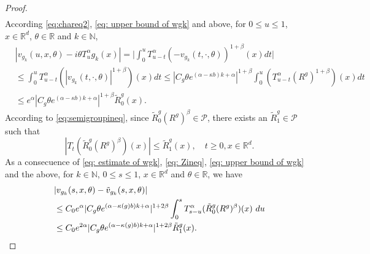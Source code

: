\documentclass[12pt, a4paper]{amsart}
\theoremstyle{definition}
\numberwithin{equation}{section}
\begin{document}
\begin{proof}
\begin{align}
\end{align}
    According \eqref{eq:chareq2}, \eqref{eq: upper bound of wgk} and above, for $0\leq u \leq 1$, $x\in \mathbb{R}^d$, $\theta \in \mathbb{R}$ and $k \in \mathbb N$,
\begin{align}
\label{eq: Zineq}
   &|v_{g_{k}}(u,x,\theta)-i\theta T_u^{\alpha}g_k(x)|
   =\Big| \int_0^u T^{\alpha}_{u-t}(-v_{g_k}(t,\cdot,\theta))^{1+\beta}(x)dt\Big|
   \\&\leq \int_0^u T_{u-t}^{\alpha}(|v_{g_k}(t,\cdot,\theta)|^{1+\beta})(x)dt
   \leq  |C_g\theta e^{(\alpha-\kappa b)k+\alpha}|^{1+\beta}\int_0^u (T_{u-t}^{\alpha}(R^g)^{1+\beta})(x)dt
   \\&\leq e^{\alpha}|C_g\theta e^{(\alpha-\kappa b)k+\alpha}|^{1+\beta}\tilde R^g_0(x).
\end{align}
    According to \eqref{eq:semigroupineq}, since $\tilde R^g_0(R^g)^{\beta} \in \mathcal P$, there exists an $\tilde R^g_1\in \mathcal P$ such that
\[
    |T_t(\tilde R^g_0(R^g)^{\beta})(x)|
    \leq \tilde R^g_1(x),
    \quad t\geq0, x\in \mathbb{R}^d.
\]
As a consecuence of \eqref{eq: estimate of wgk}, \eqref{eq: Zineq}, \eqref{eq: upper bound of wgk} and the above, for $k \in \mathbb{N}$, $0\leq s \leq 1$, $x\in \mathbb{R}^d$ and $\theta \in \mathbb R$, we have
\begin{align}
    &|v_{g_k}(s,x,\theta)-\tilde{v}_{g_k}(s,x,\theta)|
    \\&\leq C_0e^{\alpha}|C_g\theta e^{(\alpha-\kappa(g)b)k+\alpha}|^{1+2\beta} \int_0^s T_{s-u}^{\alpha}( \tilde R^g_0(R^g)^{\beta})(x)~du
    \\&\leq C_0e^{2\alpha}|C_g\theta e^{(\alpha-\kappa(g)b)k+\alpha}|^{1+2\beta}\tilde R^g_1(x).
    \qedhere
\end{align}
\end{proof}
\end{document}
